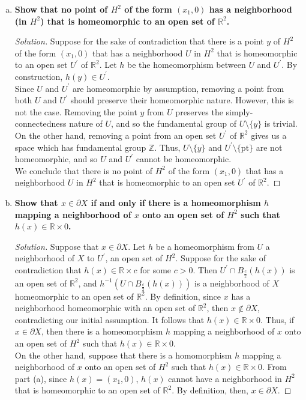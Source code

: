 \documentclass[11pt]{article}
\newcommand{\R}{\mathbb{R}}
\newcommand{\Z}{\mathbb{Z}}
\newenvironment{solution}
  {\renewcommand\qedsymbol{$\blacksquare$}\begin{proof}[Solution]}
  {\end{proof}}
\begin{document}
\begin{enumerate}[a)]
    \item \textbf{Show that no point of $H^2$ of the form $(x_1, 0)$ has a neighborhood (in $H^2$) that is homeomorphic to an open set of $\R^2$.}
    \begin{solution}
    Suppose for the sake of contradiction that there is a point $y$ of $H^2$ of the form $(x_1, 0)$ that has a neighborhood $U$ in $H^2$ that is homeomorphic to an open set $U^{\prime}$ of $\R^2$.  
    Let $h$ be the homeomorphism between $U$ and $U^{\prime}$. By construction, $h(y) \in U^{\prime}$. \\

    Since $U$ and $U^{\prime}$ are homeomorphic by assumption, removing a point from both $U$ and $U^{\prime}$ should preserve their homeomorphic nature. 
    However, this is not the case. Removing the point $y$ from $U$ preserves the simply-connectedness nature of $U$, and so the fundamental group of $U \setminus \{ y \}$ is trivial. 
    On the other hand, removing a point from an open set $U^{\prime}$ of $\R^2$ gives us a space which has fundamental group $\Z$. Thus, $U \setminus \{ y\}$ and $U^{\prime} \setminus \{\text{pt}\}$ are not homeomorphic, and
    so $U$ and $U^{\prime}$ cannot be homeomorphic. \\

    We conclude that there is no point of $H^2$ of the form $(x_1, 0)$ that has a neighborhood $U$ in $H^2$ that is homeomorphic to an open set $U^{\prime}$ of $\R^2$.  
    \end{solution}
    
    \item \textbf{Show that $x \in \partial X$ if and only if there is a homeomorphism $h$ mapping a neighborhood of $x$ onto an open set of $H^2$ such that $h(x) \in \R \times 0$.}
    \begin{solution}
    
    Suppose that $x \in \partial X$. Let $h$ be a homeomorphism from $U$ a neighborhood of $X$ to $U^{\prime}$, an open set of $H^2$. Suppose
    for the sake of contradiction that $h(x) \in \R \times c$ for some $c > 0$. Then $U^{\prime} \cap B_{\frac{c}{2}}(h(x))$ is an open set of $\R^2$, and 
    $h^{-1}(U \cap B_{\frac{c}{2}}(h(x)))$ is a neighborhood of $X$ homeomorphic to an open set of $\R^2$. By definition, since $x$ has a neighborhood homeomorphic
    with an open set of $\R^2$, then $x \notin \partial X$, contradicting our initial assumption. It follows that $h(x) \in \R \times 0$.
    Thus, if $x \in \partial X$, then there is a homeomorphism $h$ mapping a neighborhood of $x$ onto an open set of $H^2$ such that $h(x) \in \R \times 0$. \\
    
    On the other hand, suppose that there is a homomorphism $h$ mapping a neighborhood of $x$ onto an open set of $H^2$ such that $h(x) \in \R \times 0$. From part (a),
    since $h(x) = (x_1, 0)$, $h(x)$ cannot have a neighborhood in $H^2$ that is homeomorphic to an open set of $\R^2$. By definition, then, $x \in \partial X$.
    \end{solution}
\end{enumerate}
\end{document}
